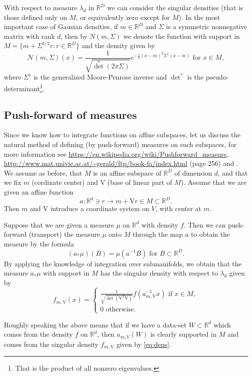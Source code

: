 \documentclass[12pt]{article}
\def\R{\mathbb{R}}
\def\v{\mathrm{V}}
\def\nor{\mathcal{N}}
\theoremstyle{definition}
\begin{document}
With respect to measure $\lambda_d$ in $\R^D$ we can consider the 
singular densities (that is those defined only on $M$, or equivalently zero 
except for $M$). In the most important case of Gausian densities, if $m \in \R^D$ and $\Sigma$ is a symmetric nonnegative 
matrix with rank $d$, then by $N(m,\Sigma)$ we denote the function with support
in $M=\{m+\Sigma^{1/2}r : r\in \R^D\}$ and the density given by
$$
\nor(m,\Sigma)(x)=\frac{1}{\sqrt{\det^{*}(2\pi \Sigma )}} e^{-\frac{1}{2}(x -m)^T{\Sigma }^\dagger (x -m)} \text{ for } x \in M,
$$
where $\Sigma^\dagger$ is the generalized Moore-Penrose inverse and $\det^*$ is the pseudo-determinant\footnote{That is the product of all nonzero eigenvalues.}.

\subsection{Push-forward of measures}

Since we know how to integrate functions on affine subspaces, let us discuss the
natural method of defining (by push-forward) measures on such subspaces,
for more information see \url{https://en.wikipedia.org/wiki/Pushforward_measure},
\url{http://www.mat.univie.ac.at/~gerald/ftp/book-fa/index.html} (page 256) and
\cite{bogachev2007measure}. We assume as before, that 
$M$ is an affine subspace of $\R^D$ of dimension $d$, and that we fix $m$ (cordinate center) and $\v$ (base of linear part of $M$).
Assume that we are given an affine function
$$
a: \R^d \ni r \to m+\v r \in M \subset \R^D.
$$
Then $m$ and $\v$ introduce a coordinate system on $V$, with center at $m$. 

Suppose that we are given a measure $\mu$ on $\R^d$ with density $f$. Then
we can push-forward (transport) the measure $\mu$ onto $M$ through the map $a$ to obtain the measure by the formula
$$
(a_* \mu)(B)=\mu(a^{-1}B) \text{ for } B \subset \R^D.
$$
By applying the knowledge of integration over submanifolds, we obtain that 
the measure $a_* \mu$ with support in $M$ has the singular density with respect to $\lambda_d$ given by
\begin{equation} \label{eq:dens}
f_{m,\v}(x)= 
\begin{cases}
\frac{1}{\sqrt{\det(\v^T\v)}}
 f(a_{m,\v}^{-1}x) \text{ if } x \in M, \\
 0 \text{ otherwise}.
 \end{cases}
\end{equation}

Roughly speaking the above means that if we have a data-set $W \subset \R^d$ which comes from the density $f$ on $\R^d$, then $a_{m,V}(W)$ is clearly supported in $M$ and comes from the singular density $f_{m,\v}$ given by 
\eqref{eq:dens}.
\end{document}
